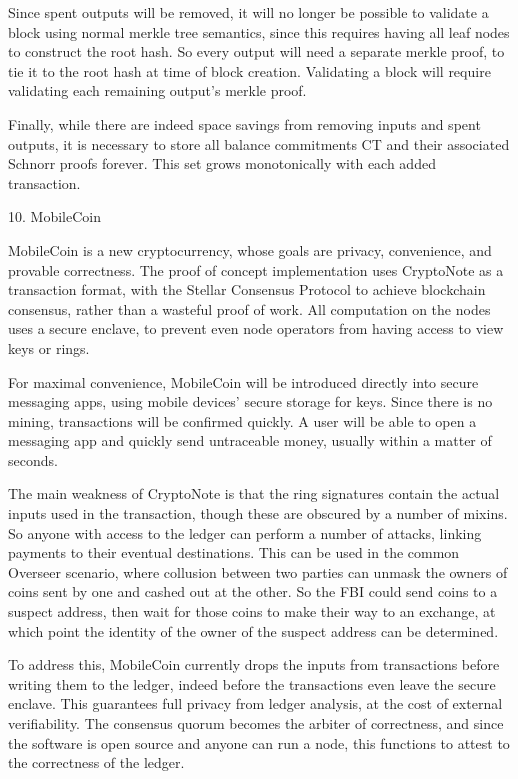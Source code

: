 \documentclass{article}
\begin{document}
Since spent outputs will be removed, it will no longer be possible to validate a block using normal merkle tree semantics, since this requires having all leaf nodes to construct the root hash.  So every output will need a separate merkle proof, to tie it to the root hash at time of block creation.  Validating a block will require validating each remaining output’s merkle proof.

Finally, while there are indeed space savings from removing inputs and spent outputs, it is necessary to store all balance commitments CT and their associated Schnorr proofs forever.  This set grows monotonically with each added transaction.  




10. MobileCoin

MobileCoin is a new cryptocurrency, whose goals are privacy, convenience, and provable correctness.  The proof of concept implementation uses CryptoNote as a transaction format, with the Stellar Consensus Protocol to achieve blockchain consensus, rather than a wasteful proof of work.  All computation on the nodes uses a secure enclave, to prevent even node operators from having access to view keys or rings.  

For maximal convenience, MobileCoin will be introduced directly into secure messaging apps, using mobile devices’ secure storage for keys.  Since there is no mining, transactions will be confirmed quickly.  A user will be able to open a messaging app and quickly send untraceable money, usually within a matter of seconds.

The main weakness of CryptoNote is that the ring signatures contain the actual inputs used in the transaction, though these are obscured by a number of mixins.  So anyone with access to the ledger can perform a number of attacks, linking payments to their eventual destinations.  This can be used in the common Overseer scenario, where collusion between two parties can unmask the owners of coins sent by one and cashed out at the other.  So the FBI could send coins to a suspect address, then wait for those coins to make their way to an exchange, at which point the identity of the owner of the suspect address can be determined.

To address this, MobileCoin currently drops the inputs from transactions before writing them to the ledger, indeed before the transactions even leave the secure enclave.  This guarantees full privacy from ledger analysis, at the cost of external verifiability.  The consensus quorum becomes the arbiter of correctness, and since the software is open source and anyone can run a node, this functions to attest to the correctness of the ledger.
\end{document}
